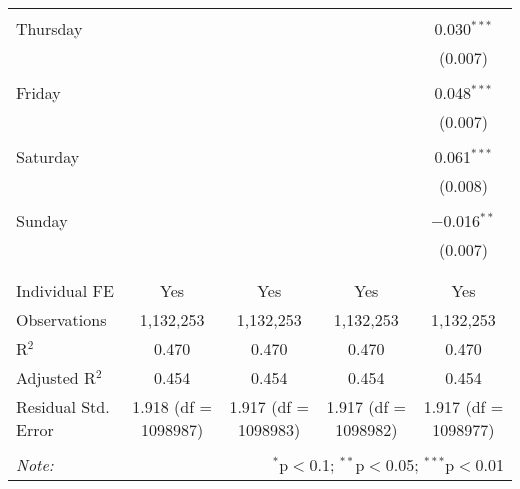 \documentclass[
]{article}
\begin{document}
\begin{table}[!htbp]
{\begin{tabular}{@{\extracolsep{5pt}}lcccc}
  & & & & \\ 
 Thursday &  &  &  & 0.030$^{***}$ \\ 
  &  &  &  & (0.007) \\ 
  & & & & \\ 
 Friday &  &  &  & 0.048$^{***}$ \\ 
  &  &  &  & (0.007) \\ 
  & & & & \\ 
 Saturday &  &  &  & 0.061$^{***}$ \\ 
  &  &  &  & (0.008) \\ 
  & & & & \\ 
 Sunday &  &  &  & $-$0.016$^{**}$ \\ 
  &  &  &  & (0.007) \\ 
  & & & & \\ 
\hline \\[-1.8ex] 
Individual FE & Yes & Yes & Yes & Yes \\ 
Observations & 1,132,253 & 1,132,253 & 1,132,253 & 1,132,253 \\ 
R$^{2}$ & 0.470 & 0.470 & 0.470 & 0.470 \\ 
Adjusted R$^{2}$ & 0.454 & 0.454 & 0.454 & 0.454 \\ 
Residual Std. Error & 1.918 (df = 1098987) & 1.917 (df = 1098983) & 1.917 (df = 1098982) & 1.917 (df = 1098977) \\ 
\hline 
\hline \\[-1.8ex] 
\textit{Note:}  & \multicolumn{4}{r}{$^{*}$p$<$0.1; $^{**}$p$<$0.05; $^{***}$p$<$0.01} \\ 
\end{tabular}
} 
\end{table} 
\newpage
\end{document}
